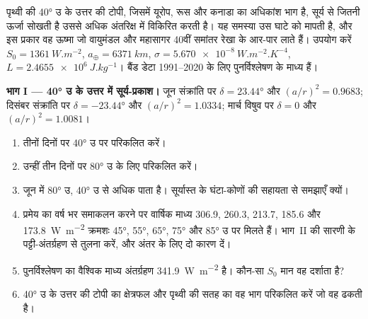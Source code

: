 \begin{problem}
\label{pb:b1:radiation-heat-transport:1}
पृथ्वी की \ang{40} उ के उत्तर की टोपी, जिसमें यूरोप, रूस और कनाडा का अधिकांश भाग है, सूर्य से जितनी ऊर्जा सोखती है उससे अधिक अंतरिक्ष में विकिरित करती है।
यह समस्या उस घाटे को मापती है, और इस प्रकार वह ऊष्मा जो वायुमंडल और महासागर 40वीं समांतर रेखा के आर-पार लाते हैं। उपयोग करें $S_0 = \qty{1361}{W.m^{-2}}$,
$a_\oplus = \qty{6371}{km}$, $\sigma = \qty{5.670e-8}{W.m^{-2}.K^{-4}}$, $L =
\qty{2.4655e6}{J.kg^{-1}}$। बैंड डेटा 1991--2020 के लिए पुनर्विश्लेषण के माध्य हैं।

\medskip
\noindent\textbf{भाग I --- \ang{40} उ के उत्तर में सूर्य-प्रकाश।} जून संक्रांति पर
$\delta = \ang{23.44}$ और $(a/r)^2 = 0.9683$; दिसंबर संक्रांति पर $\delta =
\ang{-23.44}$ और $(a/r)^2 = 1.0334$; मार्च विषुव पर $\delta = 0$ और
$(a/r)^2 = 1.0081$।
\begin{enumerate}
  \item तीनों दिनों पर \ang{40} उ पर  परिकलित करें।
  \item उन्हीं तीन दिनों पर \ang{80} उ के लिए परिकलित करें।
  \item जून में \ang{80} उ, \ang{40} उ से अधिक पाता है। सूर्यास्त के
        घंटा-कोणों की सहायता से समझाएँ क्यों।
  \item प्रमेय का वर्ष भर समाकलन करने पर वार्षिक माध्य
        \qty{306.9}{}, \qty{260.3}{}, \qty{213.7}{}, \qty{185.6}{} और
        \qty{173.8}{W.m^{-2}} क्रमशः \ang{45}, \ang{55}, \ang{65}, \ang{75} और \ang{85} उ पर मिलते हैं। भाग~II की सारणी के पट्टी-अंतर्ग्रहण से तुलना करें, और अंतर के लिए दो कारण दें।
  \item पुनर्विश्लेषण का वैश्विक माध्य अंतर्ग्रहण \qty{341.9}{W.m^{-2}} है। कौन-सा $S_0$ मान वह दर्शाता है?
  \item \ang{40} उ के उत्तर की टोपी का क्षेत्रफल और पृथ्वी की सतह का वह भाग परिकलित करें जो वह ढकती है।
\end{enumerate}


\end{problem}

